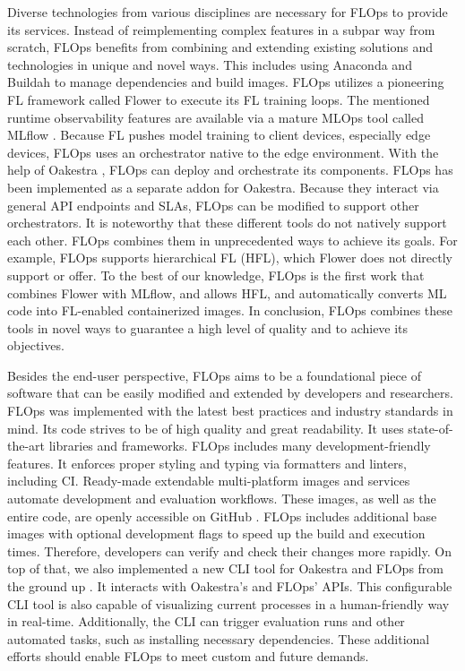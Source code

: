 Diverse technologies from various disciplines are necessary for FLOps to provide its services.
Instead of reimplementing complex features in a subpar way from scratch, FLOps benefits from combining and extending existing solutions and technologies in unique and novel ways.
This includes using Anaconda \cite{docs:anaconda} and Buildah \cite{buildah_homepage} to manage dependencies and build images.
FLOps utilizes a pioneering FL framework called Flower \cite{flower_docs} to execute its FL training loops.
The mentioned runtime observability features are available via a mature MLOps tool called MLflow \cite{mlflow:docs}.
Because FL pushes model training to client devices, especially edge devices, FLOps uses an orchestrator native to the edge environment.
With the help of Oakestra \cite{paper:oakestra_usenix}, FLOps can deploy and orchestrate its components.
FLOps has been implemented as a separate addon for Oakestra.
Because they interact via general API endpoints and SLAs, FLOps can be modified to support other orchestrators.
It is noteworthy that these different tools do not natively support each other.
FLOps combines them in unprecedented ways to achieve its goals.
For example, FLOps supports hierarchical FL (HFL), which Flower does not directly support or offer.
To the best of our knowledge, FLOps is the first work that combines Flower with MLflow, and allows HFL, and automatically converts ML code into FL-enabled containerized images.
In conclusion, FLOps combines these tools in novel ways to guarantee a high level of quality and to achieve its objectives.

Besides the end-user perspective, FLOps aims to be a foundational piece of software that can be easily modified and extended by developers and researchers.
FLOps was implemented with the latest best practices and industry standards in mind.
Its code strives to be of high quality and great readability.
It uses state-of-the-art libraries and frameworks.
FLOps includes many development-friendly features.
It enforces proper styling and typing via formatters and linters, including CI.
Ready-made extendable multi-platform images and services automate development and evaluation workflows.
These images, as well as the entire code, are openly accessible on GitHub \cite{flops_code}.
FLOps includes additional base images with optional development flags to speed up the build and execution times.
Therefore, developers can verify and check their changes more rapidly.
On top of that, we also implemented a new CLI tool for Oakestra and FLOps from the ground up \cite{cli_code}.
It interacts with Oakestra's and FLOps' APIs.
This configurable CLI tool is also capable of visualizing current processes in a human-friendly way in real-time.
Additionally, the CLI can trigger evaluation runs and other automated tasks, such as installing necessary dependencies.
These additional efforts should enable FLOps to meet custom and future demands.